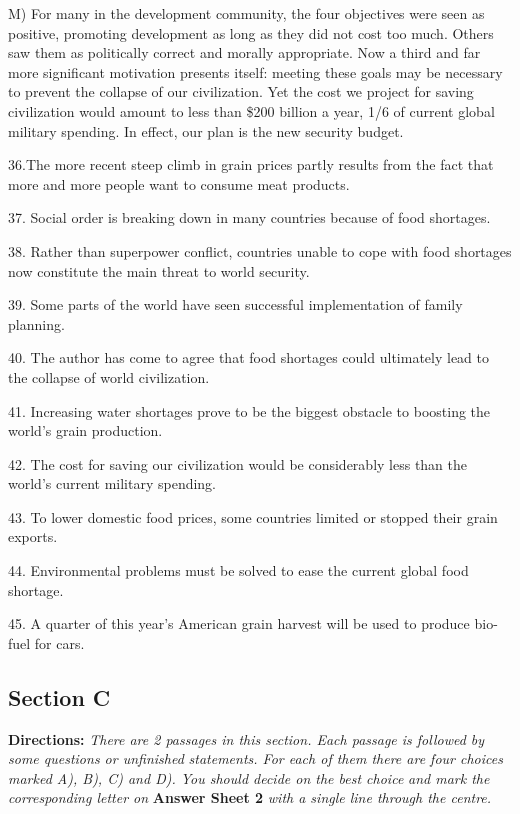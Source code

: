 \documentclass[UTF8,11pt]{ctexart}
\begin{document}
M) For many in the development community, the four objectives were seen as positive, promoting development as long as they did not cost too much. Others saw them as politically correct and morally appropriate. Now a third and far more significant motivation presents itself: meeting these goals may be necessary to prevent the collapse of our civilization. Yet the cost we project for saving civilization would amount to less than \$200 billion a year, 1/6 of current global military spending. In effect, our plan is the new security budget.


36.The more recent steep climb in grain prices partly results from the fact that more and more people want to consume meat products.


37. Social order is breaking down in many countries because of food shortages.


38. Rather than superpower conflict, countries unable to cope with food shortages now constitute the main threat to world security.


39. Some parts of the world have seen successful implementation of family planning.


40. The author has come to agree that food shortages could ultimately lead to the collapse of world civilization.


41. Increasing water shortages prove to be the biggest obstacle to boosting the world’s grain production.


42. The cost for saving our civilization would be considerably less than the world’s current military spending.


43. To lower domestic food prices, some countries limited or stopped their grain exports.


44. Environmental problems must be solved to ease the current global food shortage.


45. A quarter of this year’s American grain harvest will be used to produce bio-fuel for cars.


\subsection*{\textbf{Section C}}


\textbf{Directions:}\textit{ There are 2 passages in this section. Each passage is followed by some questions or unfinished} \textit{statements. For each of them there are four choices marked A), B), C) and D). You should decide on the best choice} \textit{and mark the corresponding letter on}\textbf{ Answer Sheet 2}\textit{ with a single line through the centre.}
\end{document}
